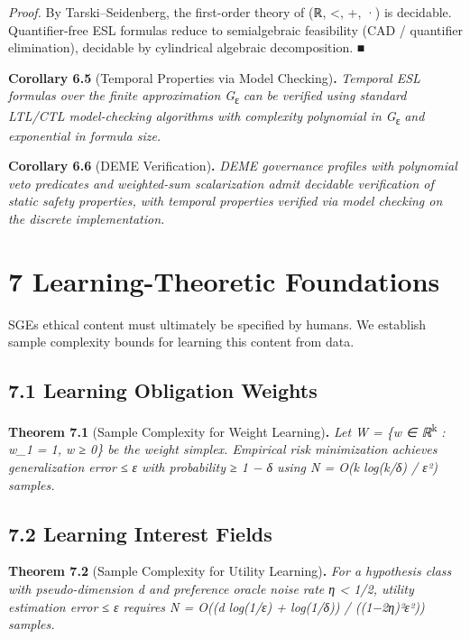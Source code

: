 \documentclass[12pt]{article}
\theoremstyle{plain}
\theoremstyle{definition}
\theoremstyle{remark}
\begin{document}
\emph{Proof.} By Tarski--Seidenberg, the first-order theory of (ℝ,
\textless, +, ·) is decidable. Quantifier-free ESL formulas reduce to
semialgebraic feasibility (CAD / quantifier elimination), decidable by
cylindrical algebraic decomposition. ■

\textbf{Corollary 6.5} (Temporal Properties via Model
Checking)\textbf{.} \emph{Temporal ESL formulas over the finite
approximation G}\textsubscript{ε} \emph{can be verified using standard
LTL/CTL model-checking algorithms with complexity polynomial in
\textbar G}\textsubscript{ε}\emph{\textbar{} and exponential in formula
size.}

\textbf{Corollary 6.6} (DEME Verification)\textbf{.} \emph{DEME
governance profiles with polynomial veto predicates and weighted-sum
scalarization admit decidable verification of static safety properties,
with temporal properties verified via model checking on the discrete
implementation.}

\section{7 Learning-Theoretic
Foundations}\label{learning-theoretic-foundations}

SGE\textquotesingle s ethical content must ultimately be specified by
humans. We establish sample complexity bounds for learning this content
from data.

\subsection{7.1 Learning Obligation
Weights}\label{learning-obligation-weights}

\textbf{Theorem 7.1} (Sample Complexity for Weight Learning)\textbf{.}
\emph{Let W = \{w ∈ ℝ}\textsuperscript{k} \emph{:
\textbar\textbar w\textbar\textbar\_1 = 1, w ≥ 0\} be the weight
simplex. Empirical risk minimization achieves generalization error ≤ ε
with probability ≥ 1 − δ using N = O(k log(k/δ) / ε²) samples.}

\subsection{7.2 Learning Interest
Fields}\label{learning-interest-fields}

\textbf{Theorem 7.2} (Sample Complexity for Utility Learning)\textbf{.}
\emph{For a hypothesis class with pseudo-dimension d and preference
oracle noise rate η \textless{} 1/2, utility estimation error ≤ ε
requires N = O((d log(1/ε) + log(1/δ)) / ((1−2η)²ε²)) samples.}
\end{document}
